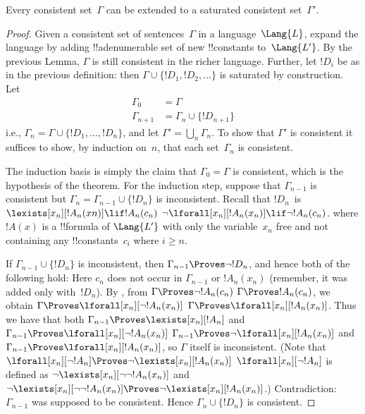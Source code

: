 \documentclass[../../include/open-logic-section]{subfiles}
\begin{document}
\begin{thm}
Every consistent set~$\Gamma$ can be extended to a saturated
consistent set~$\Gamma'$.
\end{thm}

\begin{proof}
Given a consistent set of sentences~$\Gamma$ in a language~$\Lang{L}$,
expand the language by adding !!a{denumerable} set of new
!!{constant}s to~$\Lang{L'}$. By the previous Lemma, $\Gamma$ is still
consistent in the richer language. Further, let $!D_i$ be as in the
previous definition: then $\Gamma \cup \{!D_1, !D_2, \dots\}$ is
saturated by construction. Let
\begin{align*}
\Gamma_0 & = \Gamma \\
\Gamma_{n+1} & = \Gamma_n \cup \{!D_{n+1} \}
\end{align*}
i.e., $\Gamma_n = \Gamma \cup \{ !D_1, \dots, !D_n \}$, and let
$\Gamma' = \bigcup_{n} \Gamma_n$.  To show that $\Gamma'$ is
consistent it suffices to show, by induction on~$n$, that each
set~$\Gamma_n$ is consistent.

The induction basis is simply the claim that $\Gamma_0 = \Gamma$ is
consistent, which is the hypothesis of the theorem.  For the induction
step, suppose that $\Gamma_{n-1}$ is consistent but $\Gamma_n =
\Gamma_{n-1} \cup \{!D_n\}$ is inconsistent. Recall that $!D_n$~is
{$\lexists[x_{n}][!A_{n}(xn)] \lif !A_{n}(c_{n})$}
{$\lnot\lforall[x_{n}][!A_{n}(x_n)] \lif \lnot !A_{n}(c_{n})$}. 
where $!A(x)$ is a !!{formula} of $\Lang{L'}$ with only the
variable~$x_n$ free and not containing any !!{constant}s~$c_i$ where
$i \ge n$.

If $\Gamma_{n-1} \cup \{!D_n\}$ is inconsistent, then $\Gamma_{n-1}
\Proves \lnot !D_n$, and hence both of the following hold:
Here $c_n$ does not occur in $\Gamma_{n-1}$ or $!A_n(x_n)$ (remember,
it was added only with~$!D_n$). By
, from
{$\Gamma \Proves \lnot !A_n(c_n)$} 
{$\Gamma \Proves !A_n(c_n)$}, 
we obtain 
{$\Gamma \Proves \lforall[x_n][\lnot !A_n(x_n)]$}
{$\Gamma \Proves \lforall[x_n][!A_n(x_n)]$}.
Thus we have that both 
{$\Gamma_{n-1} \Proves \lexists[x_n][!A_n]$ and 
$\Gamma_{n-1} \Proves \lforall[x_n][\lnot !A_n(x_n)]$}
{$\Gamma_{n-1} \Proves \lnot\lforall[x_n][!A_n(x_n)]$ and 
$\Gamma_{n-1} \Proves \lforall[x_n][!A_n(x_n)]$},
so $\Gamma$ itself is inconsistent. 
{(Note that 
{$\lforall[x_n][\lnot !A_n] \Proves
  \lnot\lexists[x_n][!A_n(x_n)]$}
{$\lforall[x_n][\lnot !A_n]$ is defined as
  $\lnot\lexists[x_n][\lnot\lnot !A_n(x_n)]$ and
  $\lnot\lexists[x_n][\lnot\lnot !A_n(x_n)] \Proves
  \lnot\lexists[x_n][!A_n(x_n)]$}.)}{}
Contradiction: $\Gamma_{n-1}$ was supposed to be consistent. Hence
$\Gamma_n \cup \{ !D_n\}$ is consistent.
\end{proof}
\end{document}
